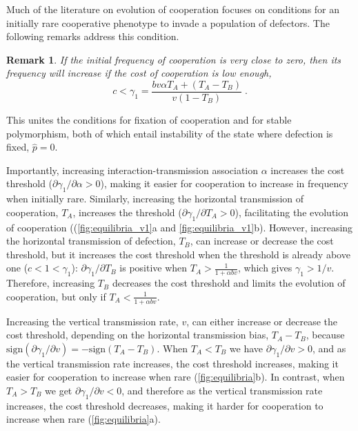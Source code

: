 \documentclass[12pt]{extarticle}
\newtheorem{remark}{Remark}
\begin{document}
Much of the literature on evolution of cooperation focuses on conditions for  an initially rare cooperative phenotype to invade a population of defectors.
The following remarks address this condition.
\\

\begin{remark}%
\label{remark:rarity}
If the initial frequency of cooperation is very close to zero, then its frequency will increase if the cost of cooperation is low enough,
\begin{equation} \label{eq:unequal_transmission_from_rarity_general_case}
c < \gamma_1 = \frac{b v \alpha T_A + (T_A - T_B)}{v(1-T_B)} \;.
\end{equation} 
\end{remark}

This unites the conditions for fixation of cooperation and for stable polymorphism, both of which entail instability of the state where defection is fixed, $\hat{p}=0$.

Importantly, increasing interaction-transmission association $\alpha$ increases the cost threshold ($\partial \gamma_1 / \partial \alpha > 0$), making it easier for cooperation to increase in frequency when initially rare.
Similarly, increasing the horizontal transmission of cooperation, $T_A$, increases the threshold ($\partial \gamma_1 / \partial T_A > 0$), facilitating the evolution of cooperation ((\autoref{fig:equilibria_v1}a and \ref{fig:equilibria_v1}b).
However, increasing the horizontal transmission of defection, $T_B$, can increase or decrease the cost threshold, but it increases the cost threshold when the threshold is already above one ($c<1<\gamma_1$): $\partial\gamma_1/\partial T_B$ is positive when $T_A > \frac{1}{1+\alpha b v}$, which gives $\gamma_1>1/v$. 
Therefore, increasing $T_B$ decreases the cost threshold and limits the evolution of cooperation, but only if $T_A < \frac{1}{1+\alpha b v}$.

Increasing the vertical transmission rate, $v$, can either increase or decrease the cost threshold, depending on the horizontal transmission bias, $T_A-T_B$, because $\text{sign}(\partial \gamma_1 / \partial v) = -\text{sign}(T_A-T_B)$.
When $T_A<T_B$ we have $\partial \gamma_1 / \partial v >0$, and as the vertical transmission rate increases, the cost threshold increases, making it easier for cooperation to increase when rare (\autoref{fig:equilibria}b). 
In contrast, when $T_A > T_B$ we get $\partial \gamma_1 / \partial v <0$, and therefore as the vertical transmission rate increases, the cost threshold decreases, making it harder for cooperation to increase when rare (\autoref{fig:equilibria}a).
\end{document}
